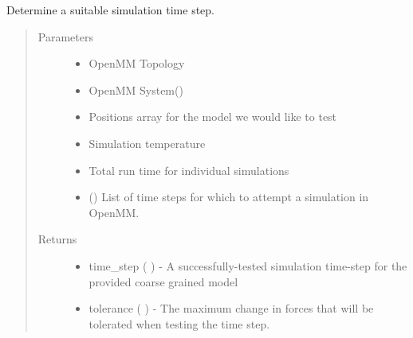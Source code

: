\documentclass[letterpaper,12pt,english,openany,oneside]{sphinxmanual}
\begin{document}
\begin{fulllineitems}
\label{\detokenize{simulation:simulation.tools.get_simulation_time_step}}
Determine a suitable simulation time step.
\begin{quote}\begin{description}
\item[{Parameters}] \leavevmode\begin{itemize}
\item {} 
 \textendash{} OpenMM Topology

\item {} 
 \textendash{} OpenMM System()

\item {} 
 \textendash{} Positions array for the model we would like to test

\item {} 
 \textendash{} Simulation temperature

\item {} 
 \textendash{} Total run time for individual simulations

\item {} 
 (\sphinxstyleliteralemphasis{\sphinxupquote{, }}) \textendash{} List of time steps for which to attempt a simulation in OpenMM.

\end{itemize}

\item[{Returns}] \leavevmode
\begin{itemize}
\item {} 
time\_step (   ) - A successfully-tested simulation time-step for the provided coarse grained model

\item {} 
tolerance (   ) - The maximum change in forces that will be tolerated when testing the time step.


\end{itemize}
\end{description}
\end{quote}
\end{fulllineitems}
\end{document}
